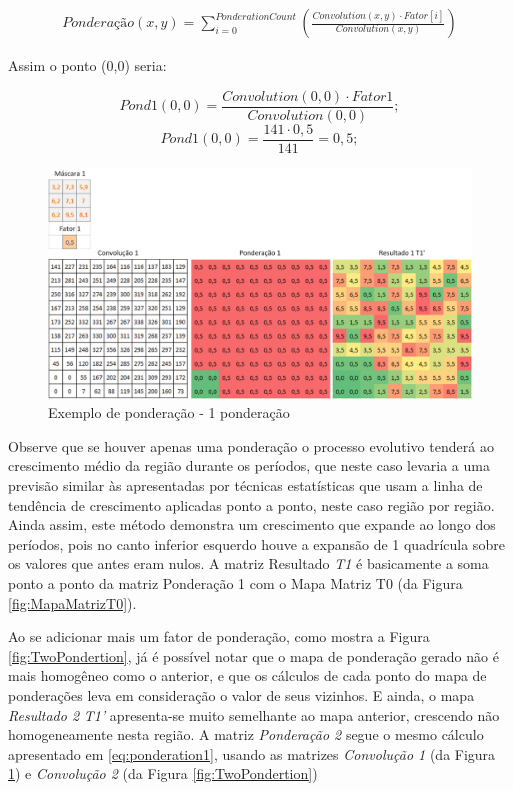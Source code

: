 \begin{equation}
\label{eq:ponderation1}
\begin{split}
Ponderação(x,y) = \sum_{i=0}^{PonderationCount} \left(\frac{Convolution(x,y) \cdot Fator[i]}{Convolution(x,y)}\right)
\end{split}
\end{equation}

Assim o ponto (0,0) seria:

\[Pond1(0,0) = \frac{Convolution(0,0) \cdot Fator1}{ Convolution(0,0)};\]
\[Pond1(0,0) = \frac{141 \cdot 0,5}{ 141 } = 0,5;\]


\begin{figure}[h]
	\centering	\includegraphics[scale=0.6]{Figuras/PonderationsExample-1Ponderation.png}
	\caption{Exemplo de ponderação - 1 ponderação}
	\label{fig:OnePondertion}
\end{figure}

Observe que se houver apenas uma ponderação o processo evolutivo tenderá ao crescimento médio da região durante os períodos, que neste caso levaria a uma previsão similar às apresentadas por técnicas estatísticas que usam a linha de tendência de crescimento aplicadas ponto a ponto, neste caso região por região. Ainda assim, este método demonstra um crescimento que expande ao longo dos períodos, pois no canto inferior esquerdo houve a expansão de 1 quadrícula sobre os valores que antes eram nulos. A matriz Resultado \emph{T1} é basicamente a soma ponto a ponto da matriz Ponderação 1 com o Mapa Matriz T0 (da Figura \ref{fig:MapaMatrizT0}).

Ao se adicionar mais um fator de ponderação, como mostra a Figura \ref{fig:TwoPondertion}, já é possível notar que o mapa de ponderação gerado não é mais homogêneo como o anterior, e que os cálculos de cada ponto do mapa de ponderações leva em consideração o valor de seus vizinhos. E ainda, o mapa \emph{Resultado 2} \emph{T1’} apresenta-se muito semelhante ao mapa anterior, crescendo não homogeneamente nesta região. A matriz \emph{Ponderação 2} segue o mesmo cálculo apresentado em \ref{eq:ponderation1}, usando as matrizes \emph{Convolução 1} (da Figura \ref{fig:OnePondertion}) e \emph{Convolução 2} (da Figura \ref{fig:TwoPondertion})

